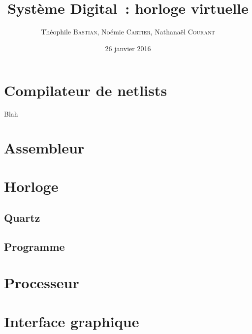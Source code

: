 \documentclass[11pt]{beamer}
\author{Théophile \textsc{Bastian}, Noémie \textsc{Cartier}, Nathanaël \textsc{Courant}}
\title{Système Digital~: horloge virtuelle}
\date{26 janvier 2016}
\begin{document}
\begin{frame}
\titlepage
\end{frame}


\section{Compilateur de netlists}

\begin{frame}{Blah}

\end{frame}

\section{Assembleur}



\section{Horloge}

\subsection{Quartz}

\subsection{Programme}



\section{Processeur}



\section{Interface graphique}
\end{document}
